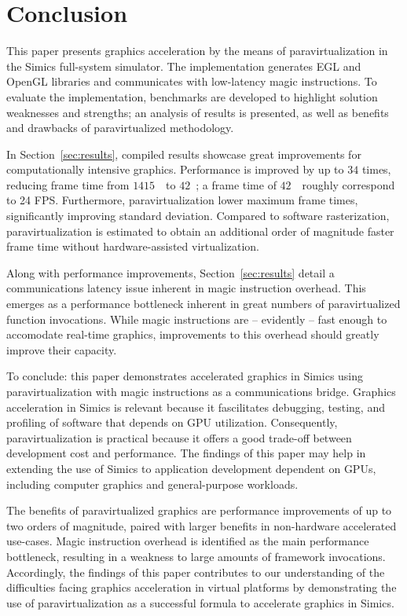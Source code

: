 
\section{Conclusion}
\label{sec:conclusion}
This paper presents graphics acceleration by the means of paravirtualization in the Simics full-system simulator.
The implementation generates EGL and OpenGL libraries and communicates with low-latency magic instructions.
To evaluate the implementation, benchmarks are developed to highlight solution weaknesses and strengths; an analysis of results is presented, as well as benefits and drawbacks of paravirtualized methodology.

In Section~\ref{sec:results}, compiled results showcase great improvements for computationally intensive graphics.
Performance is improved by up to $34$ times, reducing frame time from $1415$~\milli\second\ to $42$~\milli\second ; a frame time of $42$~\milli\second\ roughly correspond to 24 FPS.
Furthermore, paravirtualization lower maximum frame times, significantly improving standard deviation.
Compared to software rasterization, paravirtualization is estimated to obtain an additional order of magnitude faster frame time without hardware-assisted virtualization.

Along with performance improvements, Section~\ref{sec:results} detail a communications latency issue inherent in magic instruction overhead.
This emerges as a performance bottleneck inherent in great numbers of paravirtualized function invocations.
While magic instructions are -- evidently -- fast enough to accomodate real-time graphics, improvements to this overhead should greatly improve their capacity.

To conclude: this paper demonstrates accelerated graphics in Simics using paravirtualization with magic instructions as a communications bridge.
Graphics acceleration in Simics is relevant because it fascilitates debugging, testing, and profiling of software that depends on GPU utilization.
Consequently, paravirtualization is practical because it offers a good trade-off between development cost and performance.
The findings of this paper may help in extending the use of Simics to application development dependent on GPUs, including computer graphics and general-purpose workloads.

The benefits of paravirtualized graphics are performance improvements of up to two orders of magnitude, paired with larger benefits in non-hardware accelerated use-cases.
Magic instruction overhead is identified as the main performance bottleneck, resulting in a weakness to large amounts of framework invocations.
Accordingly, the findings of this paper contributes to our understanding of the difficulties facing graphics acceleration in virtual platforms by demonstrating the use of paravirtualization as a successful formula to accelerate graphics in Simics.
